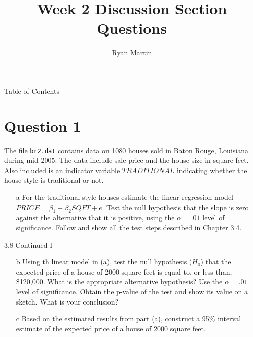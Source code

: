 \documentclass[xcolor={dvipsnames}]{beamer}
\title{ Week 2 Discussion Section Questions }
\author{Ryan Martin}
\begin{document}
	\maketitle


	\begin{frame}{Table of Contents}
		\tableofcontents
	\end{frame}

	\section{Question 1}
	
\begin{frame}{3.8}
	The file \texttt{br2.dat} contains data on 1080 houses sold in Baton Rouge, Louisiana during mid-2005. The data include sale price and the house size in square feet. Also included is an indicator variable $TRADITIONAL$ indicating whether the house style is traditional or not.

	\begin{itemize}

		\item[a] For the traditional-style houses estimate the linear regression model $PRICE = \beta_1 + \beta_2 SQFT + e$. Test the null hypothesis that the slope is zero against the alternative that it is positive, using the $\alpha = .01$ level of significance. Follow and show all the test steps described in Chapter 3.4.

	\end{itemize}

\end{frame}


\begin{frame}{3.8 Continued I}

\begin{itemize}[<+->]
	

	\item[b] Using th linear model in (a), test the null hypothesis ($H_0$) that the expected price of a house of 2000 square feet is equal to, or less than, \$120,000. What is the appropriate alternative hypothesis? Use the $\alpha = .01$ level of significance. Obtain the p-value of the test and show its value on a sketch. What is your conclusion?
	
	\item[c] Based on the estimated results from part (a), construct a 95\% interval estimate of the expected price of a house of 2000 square feet.
	
\end{itemize}

\end{frame}
\end{document}
